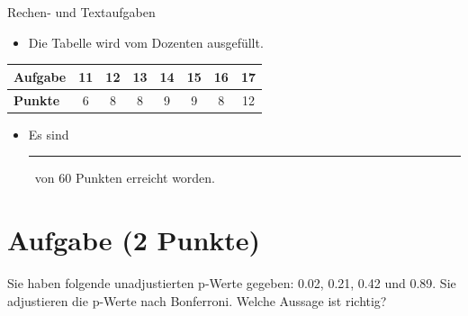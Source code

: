 \documentclass[a4paper, 9pt]{scrartcl}\usepackage[]{graphicx}\usepackage[]{xcolor}
\begin{document}
\begin{graybox}{Rechen- und Textaufgaben}
  \begin{itemize}
  \item Die Tabelle wird vom Dozenten ausgefüllt.
  \end{itemize}
  \begin{center}
    \large
    \begin{tabular}{|l|c|c|c|c|c|c|c|}
      \hline
      \textbf{Aufgabe} & 11 & 12 & 13 & 14 & 15 & 16 & 17 \strut\\
      \hline
      \textbf{Punkte} & 
      \hspace{1Ex}\Large\textcolor{gray!70}{6}\hspace{1Ex}  & 
      \hspace{1Ex}\Large\textcolor{gray!70}{8}\hspace{1Ex}  & 
      \hspace{1Ex}\Large\textcolor{gray!70}{8}\hspace{1Ex}  & 
      \hspace{1Ex}\Large\textcolor{gray!70}{9}\hspace{1Ex}  & 
      \hspace{1Ex}\Large\textcolor{gray!70}{9}\hspace{1Ex}  & 
      \hspace{1Ex}\Large\textcolor{gray!70}{8}\hspace{1Ex}  & 
      \hspace{1Ex}\Large\textcolor{gray!70}{12}\hspace{1Ex} \strut\\
      \hline
  \end{tabular}
\end{center}
\begin{itemize}
\item Es sind \rule[0ex]{2em}{.4pt}\, von 60 Punkten erreicht worden.
\end{itemize}
\end{graybox}

\clearpage

\section{Aufgabe \hfill (2 Punkte)}



Sie haben folgende unadjustierten p-Werte gegeben: 0.02, 0.21, 0.42 und 0.89. Sie adjustieren die p-Werte nach
Bonferroni. Welche Aussage ist richtig?
\end{document}
